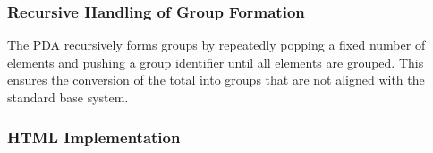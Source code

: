 \documentclass[11pt]{article}
\begin{document}
\subsubsection*{Recursive Handling of Group Formation}
The PDA recursively forms groups by repeatedly popping a fixed number of elements and pushing a group identifier until all elements are grouped. This ensures the conversion of the total into groups that are not aligned with the standard base system.




\clearpage

\subsubsection*{HTML Implementation}


\printbibliography
\end{document}
